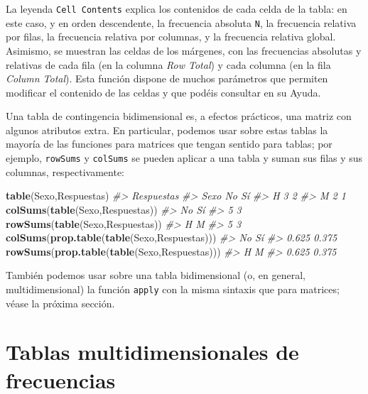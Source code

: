 \documentclass[
]{book}
\newenvironment{Shaded}{\begin{snugshade}}{\end{snugshade}}
\newcommand{\CommentTok}[1]{\textcolor[rgb]{0.56,0.35,0.01}{\textit{#1}}}
\newcommand{\KeywordTok}[1]{\textcolor[rgb]{0.13,0.29,0.53}{\textbf{#1}}}
\newcommand{\NormalTok}[1]{#1}
\theoremstyle{definition}
\theoremstyle{definition}
\theoremstyle{definition}
\theoremstyle{remark}
\begin{document}
La leyenda \texttt{Cell\ Contents} explica los contenidos de cada celda de la tabla: en este caso, y en orden descendente, la frecuencia absoluta \texttt{N}, la frecuencia relativa por filas, la frecuencia relativa por columnas, y la frecuencia relativa global. Asimismo, se muestran las celdas de los márgenes, con las frecuencias absolutas y relativas de cada fila (en la columna \emph{Row Total}) y cada columna (en la fila \emph{Column Total}). Esta función dispone de muchos parámetros que permiten modificar el contenido de las celdas y que podéis consultar en su Ayuda.

Una tabla de contingencia bidimensional es, a efectos prácticos, una matriz con algunos atributos extra. En particular, podemos usar sobre estas tablas la mayoría de las funciones para matrices que tengan sentido para tablas; por ejemplo, \texttt{rowSums} y \texttt{colSums} se pueden aplicar a una tabla y suman sus filas y sus columnas, respectivamente:

\begin{Shaded}
\begin{Highlighting}[]
\KeywordTok{table}\NormalTok{(Sexo,Respuestas)}
\CommentTok{\#\textgreater{}     Respuestas}
\CommentTok{\#\textgreater{} Sexo No Sí}
\CommentTok{\#\textgreater{}    H  3  2}
\CommentTok{\#\textgreater{}    M  2  1}
\KeywordTok{colSums}\NormalTok{(}\KeywordTok{table}\NormalTok{(Sexo,Respuestas))}
\CommentTok{\#\textgreater{} No Sí }
\CommentTok{\#\textgreater{}  5  3}
\KeywordTok{rowSums}\NormalTok{(}\KeywordTok{table}\NormalTok{(Sexo,Respuestas))}
\CommentTok{\#\textgreater{} H M }
\CommentTok{\#\textgreater{} 5 3}
\KeywordTok{colSums}\NormalTok{(}\KeywordTok{prop.table}\NormalTok{(}\KeywordTok{table}\NormalTok{(Sexo,Respuestas)))}
\CommentTok{\#\textgreater{}    No    Sí }
\CommentTok{\#\textgreater{} 0.625 0.375}
\KeywordTok{rowSums}\NormalTok{(}\KeywordTok{prop.table}\NormalTok{(}\KeywordTok{table}\NormalTok{(Sexo,Respuestas)))}
\CommentTok{\#\textgreater{}     H     M }
\CommentTok{\#\textgreater{} 0.625 0.375}
\end{Highlighting}
\end{Shaded}

También podemos usar sobre una tabla bidimensional (o, en general, multidimensional) la función \texttt{apply}
con la misma sintaxis que para matrices; véase la próxima sección.

\hypertarget{tablas-multidimensionales-de-frecuencias}{%
\section{Tablas multidimensionales de frecuencias}\label{tablas-multidimensionales-de-frecuencias}}
\end{document}
